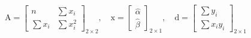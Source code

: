 \documentclass[
]{book}
\begin{document}
\[
\mathrm{A} = 
\begin{bmatrix}
n & \sum x_{i} \\
\sum x_{i} & \sum x_{i}^2
\end{bmatrix}_{2 \times 2}
,
\quad 
\mathrm{x} =
\begin{bmatrix}
\hat{\alpha} \\
\hat{ \beta}
\end{bmatrix}_{2 \times 1}
,
\quad
\mathrm{d} = 
\begin{bmatrix}
\sum y_{i}  \\
\sum x_{i} y_{i}
\end{bmatrix}_{2 \times 1}
\]

  
\end{document}
